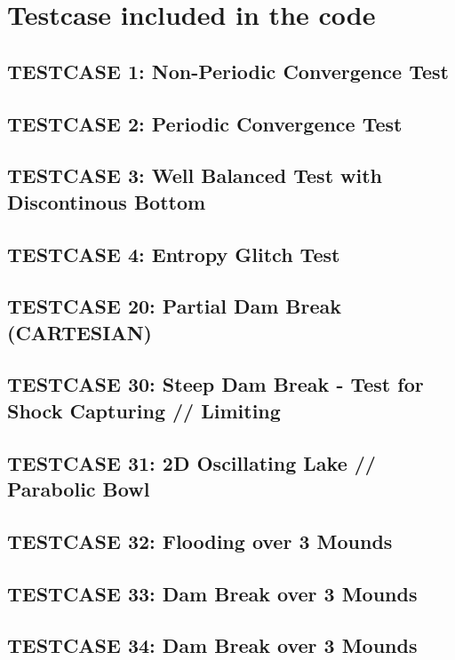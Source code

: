 \documentclass[times,sort]{elsarticle}
\theoremstyle{plain}
\theoremstyle{proofpartstyle} \newtheorem*{proofpart}{Proof of Part}
\theoremstyle{plain}
\theoremstyle{remark}
\numberwithin{equation}{section}
\begin{document}
\section{Testcase included in the code}
\subsection{TESTCASE 1: Non-Periodic Convergence Test}
\subsection{TESTCASE 2: Periodic Convergence Test}
\subsection{TESTCASE 3: Well Balanced Test with Discontinous Bottom}
\subsection{TESTCASE 4: Entropy Glitch Test}
\subsection{TESTCASE 20: Partial Dam Break (CARTESIAN)}
\subsection{TESTCASE 30: Steep Dam Break - Test for Shock Capturing // Limiting}
\subsection{TESTCASE 31: 2D Oscillating Lake // Parabolic Bowl}
\subsection{TESTCASE 32: Flooding over 3 Mounds}
\subsection{TESTCASE 33: Dam Break over 3 Mounds}
\subsection{TESTCASE 34: Dam Break over 3 Mounds}
\end{document}
